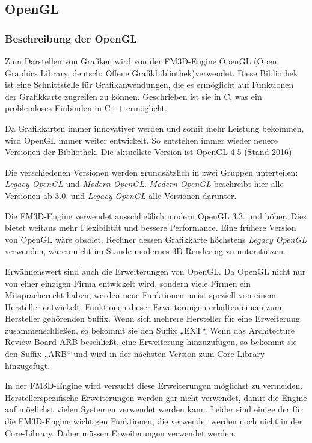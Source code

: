 \subsection{OpenGL}
\label{opengl}
\subsubsection{Beschreibung der OpenGL}
Zum Darstellen von Grafiken wird von der FM3D-Engine OpenGL (Open Graphics Library, deutsch: Offene Grafikbibliothek)verwendet. Diese Bibliothek ist eine Schnittstelle für Grafikanwendungen, die es ermöglicht auf Funktionen der Grafikkarte zugreifen zu können. Geschrieben ist sie in C, was ein problemloses Einbinden in C++ ermöglicht.

Da Grafikkarten immer innovativer werden und somit mehr Leistung bekommen, wird OpenGL immer weiter entwickelt. So entstehen immer wieder neuere Versionen der Bibliothek. Die aktuellste Version ist OpenGL 4.5 (Stand 2016). 

Die verschiedenen Versionen werden grundsätzlich in zwei Gruppen unterteilen: \textit{Legacy OpenGL} und \textit{Modern OpenGL}. \textit{Modern OpenGL} beschreibt hier alle Versionen ab 3.0. und \textit{Legacy OpenGL} alle Versionen darunter. 

Die FM3D-Engine verwendet ausschließlich modern OpenGL 3.3. und höher. Dies bietet weitaus mehr Flexibilität und bessere Performance. Eine frühere Version von OpenGL wäre obsolet.
Rechner dessen Grafikkarte höchstens \textit{Legacy OpenGL} verwenden, wären nicht im Stande modernes 3D-Rendering zu unterstützen.

Erwähnenswert sind auch die Erweiterungen von OpenGL. Da OpenGL nicht nur von einer einzigen Firma entwickelt wird, sondern viele Firmen ein Mitspracherecht haben, werden neue Funktionen meist speziell von einem Hersteller entwickelt. Funktionen dieser Erweiterungen erhalten einem zum Hersteller gehörenden Suffix. Wenn sich mehrere Hersteller für eine Erweiterung zusammenschließen, so bekommt sie den Suffix „EXT“. Wenn das Architecture Review Board ARB beschließt, eine Erweiterung hinzuzufügen, so bekommt sie den Suffix „ARB“ und wird in der nächsten Version zum Core-Library hinzugefügt. 

In der FM3D-Engine wird versucht diese Erweiterungen möglichst zu vermeiden. Herstellerspezifische Erweiterungen werden gar nicht verwendet, damit die Engine auf möglichst vielen Systemen verwendet werden kann. Leider sind einige der für die FM3D-Engine wichtigen Funktionen, die verwendet werden noch nicht in der Core-Library. Daher müssen Erweiterungen verwendet werden.

